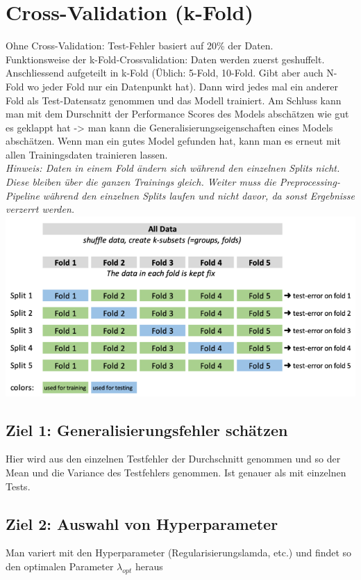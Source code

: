 \section{Cross-Validation (k-Fold)}
Ohne Cross-Validation: Test-Fehler basiert auf 20\% der Daten.\\
Funktionsweise der k-Fold-Crossvalidation: Daten werden zuerst geshuffelt. Anschliessend aufgeteilt in k-Fold (Üblich: 5-Fold, 10-Fold. Gibt aber auch N-Fold wo jeder Fold nur ein Datenpunkt hat). Dann wird jedes mal ein anderer Fold als Test-Datensatz genommen und das Modell trainiert. Am Schluss kann man mit dem Durschnitt der Performance Scores des Models abschätzen wie gut es geklappt hat -> man kann die Generalisierungseigenschaften eines Models abschätzen. Wenn man ein gutes Model gefunden hat, kann man es erneut mit allen Trainingsdaten trainieren lassen.\\
\textit{Hinweis: Daten in einem Fold ändern sich während den einzelnen Splits nicht. Diese bleiben über die ganzen Trainings gleich. Weiter muss die Preprocessing-Pipeline während den einzelnen Splits laufen und nicht davor, da sonst Ergebnisse verzerrt werden.}
\includegraphics[width=\linewidth]{img/cross-validation.png}
\subsection{Ziel 1: Generalisierungsfehler schätzen}
Hier wird aus den einzelnen Testfehler der Durchschnitt genommen und so der Mean und die Variance des Testfehlers genommen. Ist genauer als mit einzelnen Tests.
\subsection{Ziel 2: Auswahl von Hyperparameter}
Man variert mit den Hyperparameter (Regularisierungslamda, etc.) und findet so den optimalen Parameter $\lambda_{opt}$ heraus
